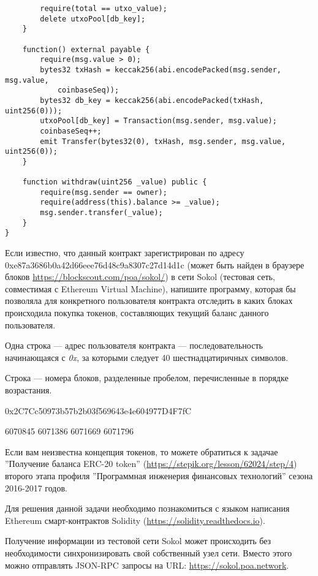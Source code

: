 \begin{verbatim}
        require(total == utxo_value);
        delete utxoPool[db_key];
    }
   
    function() external payable {
        require(msg.value > 0);
        bytes32 txHash = keccak256(abi.encodePacked(msg.sender, msg.value, 
            coinbaseSeq));
        bytes32 db_key = keccak256(abi.encodePacked(txHash, uint256(0)));
        utxoPool[db_key] = Transaction(msg.sender, msg.value);
        coinbaseSeq++;
        emit Transfer(bytes32(0), txHash, msg.sender, msg.value, uint256(0));
    }
    
    function withdraw(uint256 _value) public {
        require(msg.sender == owner);
        require(address(this).balance >= _value);
        msg.sender.transfer(_value);
    }
}
\end{verbatim}

Если известно, что данный контракт зарегистрирован по адресу \newline 0xe87a3686b0a42d66eee76d48c9a8307c27d14d1c (может быть найден в браузере блоков \url{https://blockscout.com/poa/sokol/}) в сети Sokol (тестовая сеть, совместимая с Ethereum Virtual Machine), напишите программу, которая бы позволяла для конкретного пользователя контракта отследить в каких блоках происходила покупка токенов, составляющих текущий баланс данного пользователя.  


Одна строка --- адрес пользователя контракта --- последовательность начинающаяся с \textit{0x}, за которыми следует 40 шестнадцатиричных символов.

\outputfmtSection

Строка --- номера блоков, разделенные пробелом, перечисленные в порядке возрастания.

\exampleSection


\begin{myverbbox}[\small]{\vinput}
0x2C7Cc50973b57b2b03f569643e4e604977D4F7fC
\end{myverbbox}
\begin{myverbbox}[\small]{\voutput}
6070845 6071386 6071669 6071796
\end{myverbbox}

\commentsSection
Если вам неизвестна концепция токенов, то можете обратиться к задачае ''Получение баланса ERC-20 token'' (\url{https://stepik.org/lesson/62024/step/4}) второго этапа профиля ''Программная инженерия финансовых технологий'' сезона 2016-2017 годов.

Для решения данной задачи необходимо познакомиться с языком написания Ethereum смарт-контрактов Solidity (\url{https://solidity.readthedocs.io}).

Получение информации из тестовой сети Sokol может происходить без необходимости синхронизировать свой собственный узел сети. Вместо этого можно отправлять JSON-RPC запросы на URL: \url{https://sokol.poa.network}. 

